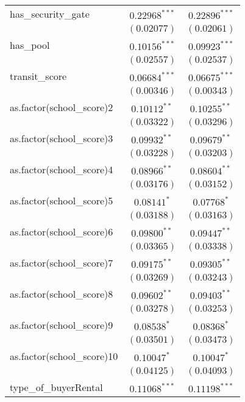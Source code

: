 \begin{table}
\begin{center}
\begin{tabular}{l c c}
has\_security\_gate        & $0.22968^{***}$  & $0.22896^{***}$  \\
                           & $(0.02077)$      & $(0.02061)$      \\
has\_pool                  & $0.10156^{***}$  & $0.09923^{***}$  \\
                           & $(0.02557)$      & $(0.02537)$      \\
transit\_score             & $0.06684^{***}$  & $0.06675^{***}$  \\
                           & $(0.00346)$      & $(0.00343)$      \\
as.factor(school\_score)2  & $0.10112^{**}$   & $0.10255^{**}$   \\
                           & $(0.03322)$      & $(0.03296)$      \\
as.factor(school\_score)3  & $0.09932^{**}$   & $0.09679^{**}$   \\
                           & $(0.03228)$      & $(0.03203)$      \\
as.factor(school\_score)4  & $0.08966^{**}$   & $0.08604^{**}$   \\
                           & $(0.03176)$      & $(0.03152)$      \\
as.factor(school\_score)5  & $0.08141^{*}$    & $0.07768^{*}$    \\
                           & $(0.03188)$      & $(0.03163)$      \\
as.factor(school\_score)6  & $0.09800^{**}$   & $0.09447^{**}$   \\
                           & $(0.03365)$      & $(0.03338)$      \\
as.factor(school\_score)7  & $0.09175^{**}$   & $0.09305^{**}$   \\
                           & $(0.03269)$      & $(0.03243)$      \\
as.factor(school\_score)8  & $0.09602^{**}$   & $0.09403^{**}$   \\
                           & $(0.03278)$      & $(0.03253)$      \\
as.factor(school\_score)9  & $0.08538^{*}$    & $0.08368^{*}$    \\
                           & $(0.03501)$      & $(0.03473)$      \\
as.factor(school\_score)10 & $0.10047^{*}$    & $0.10047^{*}$    \\
                           & $(0.04125)$      & $(0.04093)$      \\
type\_of\_buyerRental      & $0.11068^{***}$  & $0.11198^{***}$  \\

\end{tabular}
\end{center}
\end{table}
